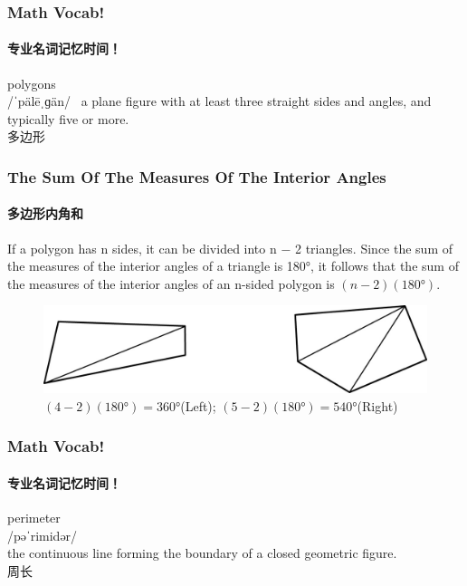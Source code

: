 \documentclass[
	11pt, %
]{beamer}
\begin{document}

\begin{frame}
	\frametitle{Math Vocab!} %
	\framesubtitle{专业名词记忆时间！}
	
	{\Huge polygons}\\
	{\LARGE /ˈpälēˌɡän/\
		\bigskip\bigskip
	a plane figure with at least three straight sides and angles, and typically five or more. \\ 
	多边形}

\end{frame}



\begin{frame}
	\frametitle{The Sum Of The Measures Of The Interior Angles} %
	\framesubtitle{多边形内角和}
	\begin{theorem}
		If a polygon has n sides, it can be divided into n − 2 triangles. Since the
sum of the measures of the interior angles of a triangle is 180°, it follows that
the sum of the measures of the interior angles of an n-sided polygon is $(n − 2)(\ang{180})$.
	\end{theorem}
	\begin{figure}
		\includegraphics[width=\linewidth]{Interior_Angles_Polygon.jpg}
		\caption{$(4-2)(\ang{180})=\ang{360}$(Left); $(5-2)(\ang{180})=\ang{540}$(Right)}
	\end{figure}
\end{frame}	


\begin{frame}
	\frametitle{Math Vocab!} %
	\framesubtitle{专业名词记忆时间！}
	
	{\Huge perimeter}\\
	{\LARGE /pəˈrimidər/\\
		\bigskip\bigskip
	the continuous line forming the boundary of a closed geometric figure. \\ 
	周长}

\end{frame}
\end{document}
